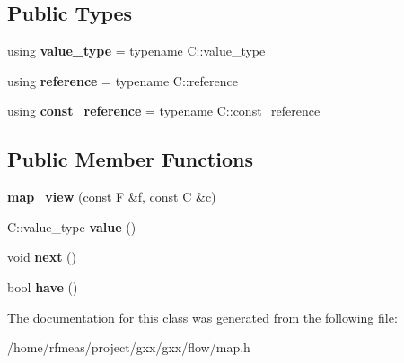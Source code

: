 \subsection*{Public Types}
\begin{DoxyCompactItemize}
\item 
using {\bfseries value\+\_\+type} = typename C\+::value\+\_\+type\hypertarget{classgxx_1_1flow_1_1map__view_a7eead90d387b96cd8b576ea65512aab6}{}\label{classgxx_1_1flow_1_1map__view_a7eead90d387b96cd8b576ea65512aab6}

\item 
using {\bfseries reference} = typename C\+::reference\hypertarget{classgxx_1_1flow_1_1map__view_a44a6af74c93fb01ddb20a142ad14d72d}{}\label{classgxx_1_1flow_1_1map__view_a44a6af74c93fb01ddb20a142ad14d72d}

\item 
using {\bfseries const\+\_\+reference} = typename C\+::const\+\_\+reference\hypertarget{classgxx_1_1flow_1_1map__view_a8fbc38be10015b63adddd0bdf2beb396}{}\label{classgxx_1_1flow_1_1map__view_a8fbc38be10015b63adddd0bdf2beb396}

\end{DoxyCompactItemize}
\subsection*{Public Member Functions}
\begin{DoxyCompactItemize}
\item 
{\bfseries map\+\_\+view} (const F \&f, const C \&c)\hypertarget{classgxx_1_1flow_1_1map__view_a46c8417113f46ea2e7e4ef9a8f20a938}{}\label{classgxx_1_1flow_1_1map__view_a46c8417113f46ea2e7e4ef9a8f20a938}

\item 
C\+::value\+\_\+type {\bfseries value} ()\hypertarget{classgxx_1_1flow_1_1map__view_a2ed45e05e7c4228c468af488b5c00bb6}{}\label{classgxx_1_1flow_1_1map__view_a2ed45e05e7c4228c468af488b5c00bb6}

\item 
void {\bfseries next} ()\hypertarget{classgxx_1_1flow_1_1map__view_aa63b2e7fc104213feac858c5d8676986}{}\label{classgxx_1_1flow_1_1map__view_aa63b2e7fc104213feac858c5d8676986}

\item 
bool {\bfseries have} ()\hypertarget{classgxx_1_1flow_1_1map__view_a39b976fb2fbc7a16092516a976cb6559}{}\label{classgxx_1_1flow_1_1map__view_a39b976fb2fbc7a16092516a976cb6559}

\end{DoxyCompactItemize}


The documentation for this class was generated from the following file\+:\begin{DoxyCompactItemize}
\item 
/home/rfmeas/project/gxx/gxx/flow/map.\+h\end{DoxyCompactItemize}
